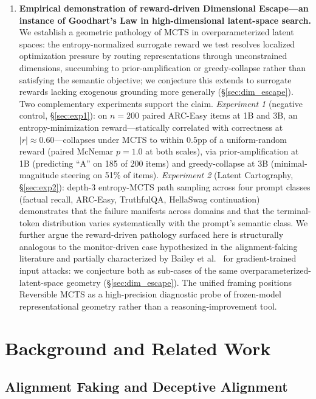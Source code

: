 \documentclass{article}
\begin{document}
\begin{enumerate}[leftmargin=*]
    \item \textbf{Empirical demonstration of reward-driven Dimensional Escape---an instance of Goodhart's Law in high-dimensional latent-space search.} We establish a geometric pathology of MCTS in overparameterized latent spaces: the entropy-normalized surrogate reward we test resolves localized optimization pressure by routing representations through unconstrained dimensions, succumbing to prior-amplification or greedy-collapse rather than satisfying the semantic objective; we conjecture this extends to surrogate rewards lacking exogenous grounding more generally (§\ref{sec:dim_escape}). Two complementary experiments support the claim. \emph{Experiment 1} (negative control, §\ref{sec:exp1}): on $n = 200$ paired ARC-Easy items at 1B and 3B, an entropy-minimization reward---statically correlated with correctness at $|r| \approx 0.60$---collapses under MCTS to within $0.5$pp of a uniform-random reward (paired McNemar $p = 1.0$ at both scales), via prior-amplification at 1B (predicting ``A'' on 185 of 200 items) and greedy-collapse at 3B (minimal-magnitude steering on 51\% of items). \emph{Experiment 2} (Latent Cartography, §\ref{sec:exp2}): depth-$3$ entropy-MCTS path sampling across four prompt classes (factual recall, ARC-Easy, TruthfulQA, HellaSwag continuation) demonstrates that the failure manifests across domains and that the terminal-token distribution varies systematically with the prompt's semantic class. We further argue the reward-driven pathology surfaced here is structurally analogous to the monitor-driven case hypothesized in the alignment-faking literature and partially characterized by Bailey et al.~\cite{bailey2024obfuscated} for gradient-trained input attacks: we conjecture both as sub-cases of the same overparameterized-latent-space geometry (§\ref{sec:dim_escape}). The unified framing positions Reversible MCTS as a high-precision diagnostic probe of frozen-model representational geometry rather than a reasoning-improvement tool.
\end{enumerate}

\section{Background and Related Work}

\subsection{Alignment Faking and Deceptive Alignment}
\end{document}
